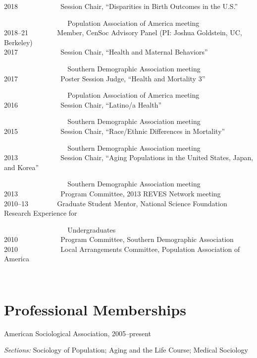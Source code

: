 \documentclass[11pt,]{article}
\begin{document}
2018 ~ ~ ~ ~ ~ ~ ~ Session Chair, ``Disparities in Birth Outcomes in the
U.S.''\\
\strut ~ ~ ~ ~ ~ ~ ~ ~ ~ ~ ~ Population Association of America meeting\\
2018--21 ~ ~ ~ ~ ~Member, CenSoc Advisory Panel (PI: Joshua Goldstein,
UC, Berkeley)\\
2017 ~ ~ ~ ~ ~ ~ ~ Session Chair, ``Health and Maternal Behaviors''\\
\strut ~ ~ ~ ~ ~ ~ ~ ~ ~ ~ ~ Southern Demographic Association meeting\\
2017 ~ ~ ~ ~ ~ ~ ~ Poster Session Judge, ``Health and Mortality 3''\\
\strut ~ ~ ~ ~ ~ ~ ~ ~ ~ ~ ~ Population Association of America meeting\\
2016 ~ ~ ~ ~ ~ ~ ~ Session Chair, ``Latino/a Health''\\
\strut ~ ~ ~ ~ ~ ~ ~ ~ ~ ~ ~ Southern Demographic Association meeting\\
2015 ~ ~ ~ ~ ~ ~ ~ Session Chair, ``Race/Ethnic Differences in
Mortality''\\
\strut ~ ~ ~ ~ ~ ~ ~ ~ ~ ~ ~ Southern Demographic Association meeting\\
2013 ~ ~ ~ ~ ~ ~ ~ Session Chair, ``Aging Populations in the United
States, Japan, and Korea''\\
\strut ~ ~ ~ ~ ~ ~ ~ ~ ~ ~ ~ Southern Demographic Association meeting\\
2013 ~ ~ ~ ~ ~ ~ ~ Program Committee, 2013 REVES Network meeting\\
2010--13 ~ ~ ~ ~ ~Graduate Student Mentor, National Science Foundation
Research Experience for\\
\strut ~ ~ ~ ~ ~ ~ ~ ~ ~ ~ ~ Undergraduates\\
2010 ~ ~ ~ ~ ~ ~ ~ Program Committee, Southern Demographic Association\\
2010 ~ ~ ~ ~ ~ ~ ~ Local Arrangements Committee, Population Association
of America

~

\section{Professional Memberships}\label{professional-memberships}

American Sociological Association, 2005--present

\setlength{\leftskip}{0.75cm}

\emph{Sections:} Sociology of Population; Aging and the Life Course;
Medical Sociology
\end{document}
